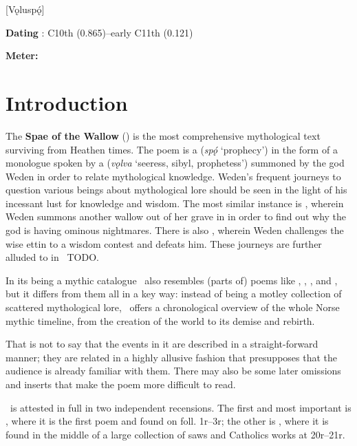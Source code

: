 [Vǫluspǫ́]
\def\thisBookCode{Voluspa}

\begin{flushright}%
\textbf{Dating} \parencite{Sapp2022}: C10th (0.865)–early C11th (0.121)

\textbf{Meter:} \Fornyrdislag%
\end{flushright}

\section{Introduction}

The \textbf{Spae of the Wallow} (\Voluspa) is the most comprehensive mythological text surviving from Heathen times.  The poem is a  (\emph{spǫ́} ‘prophecy’) in the form of a monologue spoken by a  (\emph{vǫlva} ‘seeress, sibyl, prophetess’) summoned by the god Weden in order to relate mythological knowledge.  Weden’s frequent journeys to question various beings about mythological lore should be seen in the light of his incessant lust for knowledge and wisdom.  The most similar instance is \Baldrsdraumar, wherein Weden summons another wallow out of her grave in  in order to find out why the god  is having ominous nightmares.  There is also \Vafthrudnismal, wherein Weden challenges the wise ettin  to a wisdom contest and defeats him.  These journeys are further alluded to in \Harbardsljod\ TODO.

In its being a mythic catalogue \Voluspa\ also resembles (parts of) poems like \Havamal, \Grimnismal, \Sigrdrifumal, and \Alvissmal, but it differs from them all in a key way: instead of being a motley collection of scattered mythological lore, \Voluspa\ offers a chronological overview of the whole Norse mythic timeline, from the creation of the world to its demise and rebirth.

That is not to say that the events in it are described in a straight-forward manner; they are related in a highly allusive fashion that presupposes that the audience is already familiar with them.  There may also be some later omissions and inserts that make the poem more difficult to read.

\Voluspa\ is attested in full in two independent recensions.  The first and most important is \Regius, where it is the first poem and found on foll. 1r–3r; the other is \Hauksbok, where it is found in the middle of a large collection of saws and Catholics works at 20r–21r.

